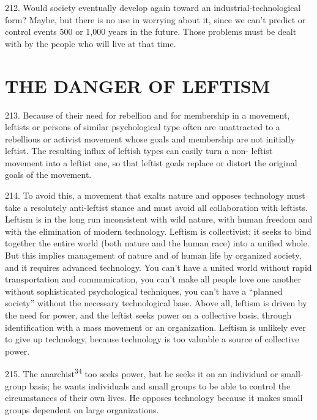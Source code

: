 \documentclass{article}
\begin{document}
212. Would society eventually develop again toward an industrial-technological form? Maybe, 
but there is no use in worrying about it, since we can’t predict or control events 500 or 1,000 years 
in the future. Those problems must be dealt with by the people who will live at that time. 


\section{THE DANGER OF LEFTISM}

\hspace{0.5cm} 213. Because of their need for rebellion and for membership in a movement, leftists or persons of 
similar psychological type often are unattracted to a rebellious or activist movement whose goals 
and membership are not initially leftist. The resulting influx of leftish types can easily turn a non-
leftist movement into a leftist one, so that leftist goals replace or distort the original goals of the 
movement. \vspace{\baselineskip} \newpage

214. To avoid this, a movement that exalts nature and opposes technology must take a resolutely 
anti-leftist stance and must avoid all collaboration with leftists. Leftism is in the long run 
inconsistent with wild nature, with human freedom and with the elimination of modern 
technology. Leftism is collectivist; it seeks to bind together the entire world (both nature and the 
human race) into a unified whole. But this implies management of nature and of human life by 
organized society, and it requires advanced technology. You can’t have a united world without 
rapid transportation and communication, you can’t make all people love one another without 
sophisticated psychological techniques, you can’t have a “planned society” without the necessary 
technological base. Above all, leftism is driven by the need for power, and the leftist seeks power 
on a collective basis, through identification with a mass movement or an organization. Leftism is 
unlikely ever to give up technology, because technology is too valuable a source of collective 
power. \vspace{\baselineskip}

215. The anarchist\textsuperscript{34} too seeks power, but he seeks it on an individual or small-group basis; he 
wants individuals and small groups to be able to control the circumstances of their own lives. He 
opposes technology because it makes small groups dependent on large organizations. \vspace{\baselineskip}
\end{document}
